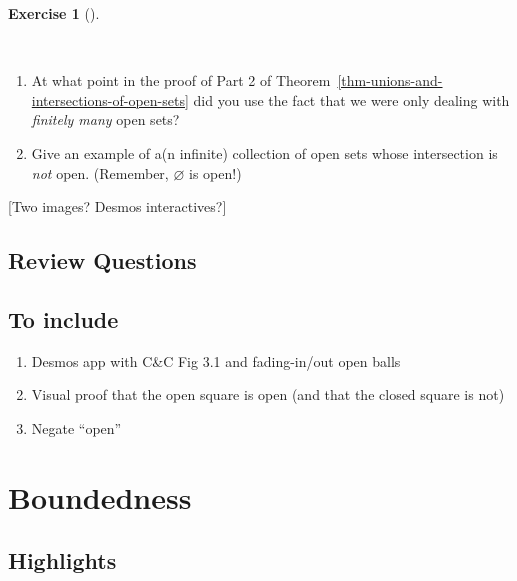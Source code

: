 \documentclass[
  letterpaper,
  DIV=11,
  numbers=noendperiod]{scrreprt}
\providecommand{\tightlist}{%
  \setlength{\itemsep}{0pt}\setlength{\parskip}{0pt}}
\theoremstyle{plain}
\theoremstyle{definition}
\newtheorem{exercise}{Exercise}[chapter]
\theoremstyle{plain}
\theoremstyle{plain}
\theoremstyle{definition}
\theoremstyle{definition}
\theoremstyle{remark}
\begin{document}
\begin{exercise}[]\protect\hypertarget{exr-infinite-intersection-of-open-sets}{}\label{exr-infinite-intersection-of-open-sets}

~

\begin{enumerate}
\def\labelenumi{\arabic{enumi}.}
\tightlist
\item
  At what point in the proof of Part 2 of
  Theorem~\ref{thm-unions-and-intersections-of-open-sets} did you use
  the fact that we were only dealing with \emph{finitely many} open
  sets?
\item
  Give an example of a(n infinite) collection of open sets whose
  intersection is \emph{not} open. (Remember, \(\varnothing\) is open!)
\end{enumerate}

\end{exercise}

{[}Two images? Desmos interactives?{]}

\section*{Review Questions}\label{review-questions-6}


\section{To include}\label{to-include}

\begin{enumerate}
\def\labelenumi{\arabic{enumi}.}
\setcounter{enumi}{4}
\tightlist
\item
  Desmos app with C\&C Fig 3.1 and fading-in/out open balls
\item
  Visual proof that the open square is open (and that the closed square
  is not)
\item
  Negate ``open''
\end{enumerate}

\chapter{Boundedness}\label{boundedness}

\section*{Highlights}\label{highlights-7}
\end{document}
